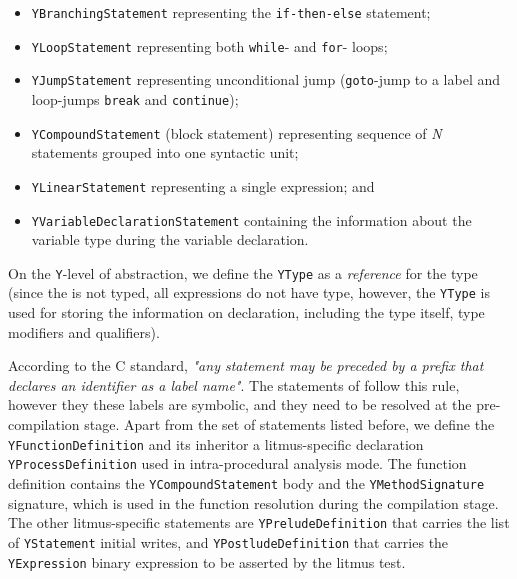 \begin{itemize}%
  \item \texttt{YBranchingStatement} representing the \texttt{if-then-else} statement;
  
  \item \texttt{YLoopStatement} representing both \texttt{while}- and \texttt{for}- loops;%
  
  \item \texttt{YJumpStatement} representing unconditional jump (\texttt{goto}-jump to a label and loop-jumps \texttt{break} and \texttt{continue});
  
  \item \texttt{YCompoundStatement} (block statement) representing sequence of \textit{N} statements grouped into one syntactic unit;
  
  \item \texttt{YLinearStatement} representing a single expression; and
  
  \item \texttt{YVariableDeclarationStatement} containing the information about the variable type during the variable declaration.
\end{itemize}

On the \texttt{Y}-level of abstraction, we define the \texttt{YType} as a \textit{reference} for the type (since the \ytree{} is not typed, all expressions do not have type, however, the \texttt{YType} is used for storing the information on declaration, including the type itself, type modifiers and qualifiers).

According to the C standard, \textit{"any statement may be preceded by a prefix that declares an identifier as a label name"}.
The \ytree{} statements of follow this rule, however they these labels are symbolic, and they need to be resolved at the pre-compilation stage.
Apart from the set of statements listed before, we define the \texttt{YFunctionDefinition} and its inheritor a litmus-specific declaration \texttt{YProcessDefinition}
used in intra-procedural analysis mode.
The function definition contains the \texttt{YCompoundStatement} body and the \texttt{YMethodSignature} signature, which is used in the function resolution during the compilation stage. %
The other litmus-specific statements are \texttt{YPreludeDefinition}
that carries the list of \texttt{YStatement} initial writes, and \texttt{YPostludeDefinition} 
that carries the \texttt{YExpression} binary expression to be asserted by the litmus test.


